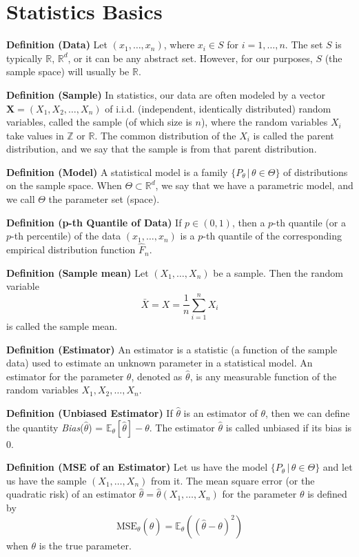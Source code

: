 \documentclass[12pt,a4paper,oneside]{book} %
\begin{document}
	\section{Statistics Basics}

\textbf{Definition (Data)} Let $(x_1, \ldots, x_n)$, where $x_i \in S$ for $i = 1, \ldots, n$. The set $S$ is typically $\mathbb{R}$, $\mathbb{R}^d$, or it can be any abstract set. However, for our purposes, $S$ (the sample space) will usually be $\mathbb{R}$.

\textbf{Definition (Sample)} In statistics, our data are often modeled by a vector $\mathbf{X} = (X_1, X_2, \ldots, X_n)$ of i.i.d. (independent, identically distributed) random variables, called the sample (of which size is $n$), where the random variables $X_i$ take values in $\mathbb{Z}$ or $\mathbb{R}$. The common distribution of the $X_i$ is called the parent distribution, and we say that the sample is from that parent distribution.	

\textbf{Definition (Model)} A statistical model is a family $\{P_{\theta} \,|\, \theta \in \Theta\}$ of distributions on the sample space. When $\Theta \subset \mathbb{R}^d$, we say that we have a parametric model, and we call $\Theta$ the parameter set (space).

\textbf{Definition (p-th Quantile of Data)} If $p \in (0, 1)$, then a $p$-th quantile (or a $p$-th percentile) of the data $(x_1, \ldots, x_n)$ is a $p$-th quantile of the corresponding empirical distribution function $\hat{F}_n$.

\textbf{Definition (Sample mean)} Let $(X_1, \ldots, X_n)$ be a sample. Then the random variable
\[ \bar{X} = X = \frac{1}{n} \sum_{i=1}^{n} X_i \]
is called the sample mean.

\textbf{Definition (Estimator)} An estimator is a statistic (a function of the sample data) used to estimate an unknown parameter in a statistical model. An estimator for the parameter $\theta$, denoted as $\hat{\theta}$, is any measurable function of the random variables $X_1, X_2, \ldots, X_n$.

\textbf{Definition (Unbiased Estimator)} If $\hat{\theta}$ is an estimator of $\theta$, then we can define the quantity \textit{Bias}($\hat{\theta}$) = $\mathbb{E}_{\theta}[\hat{\theta}] - \theta$. The estimator $\hat{\theta}$ is called unbiased if its bias is 0.

\textbf{Definition (MSE of an Estimator)} Let us have the model $\{P_{\theta} \,|\, \theta \in \Theta\}$ and let us have the sample $(X_1, \ldots, X_n)$ from it. The mean square error (or the quadratic risk) of an estimator $\hat{\theta} = \hat{\theta}(X_1, \ldots, X_n)$ for the parameter $\theta$ is defined by
\[ \text{MSE}_{\theta}(\hat{\theta}) = \mathbb{E}_{\theta}((\hat{\theta} - \theta)^2) \]
when $\theta$ is the true parameter.
\end{document}
